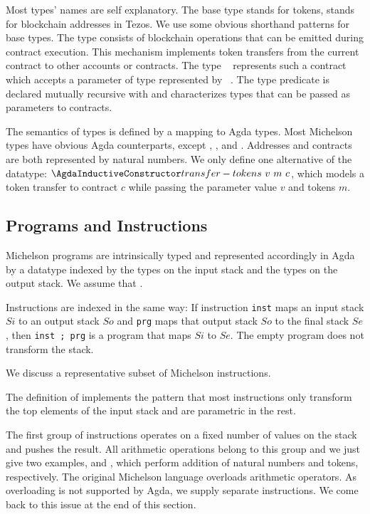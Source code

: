 Most types' names are self explanatory. The base type {\Amutez} stands
for tokens, {\Aaddr} stands for blockchain addresses in  Tezos. We use
some obvious shorthand patterns for base types.
The type {\Aoperation} consists of blockchain operations that can
be emitted during contract execution. This mechanism implements token
transfers from the current contract to other accounts or contracts.
The type {\Acontract~\AP} represents such a contract
which accepts a parameter of type {\Aty} represented by {\APassable~\Aty}.
The type predicate {\TypesPassable} is declared mutually recursive with {\AType}
and characterizes types that can be passed as parameters to contracts.

The semantics of types is defined by a mapping to Agda types. Most
Michelson types have  obvious Agda counterparts, except {\Aaddr},
{\Acontract}, and {\Aoperation}.  Addresses and contracts are both
represented by natural numbers. We only define one alternative of the
{\AOperation} datatype: {$\AtransferTokens~v~m~c$}, which models a
token transfer to contract $c$ while passing the parameter value $v$
and tokens $m$.

\subsection{Programs and Instructions}
\label{sec:michelson-programs}


Michelson programs are intrinsically typed and represented accordingly in
Agda by a datatype {\AProgram} indexed by the types on the input stack
and the types on the output stack. We assume that \TypesStack.
\SyntaxProgram

Instructions are indexed in the same way:
If  instruction \verb/inst/ maps an input stack $Si$ to an output stack $So$
and \verb/prg/ maps that output stack $So$ to the final stack $Se$,
then \verb/inst ; prg/ is a program that maps $Si$ to $Se$.
The empty program {\Aend} does not transform the stack.

We discuss a representative subset of Michelson instructions.
\SyntaxInstruction

The definition of {\AInstructionPlus} implements the pattern that most
instructions only transform the top elements of the input stack and are parametric in the rest. 

The first group of instructions operates on a fixed number of values on
the stack and pushes the result. All arithmetic operations belong to
this group and we just give two examples, {\AADDnn}  and {\AADDm},
which perform addition of natural numbers and tokens, respectively.
The original Michelson language overloads arithmetic operators. As
overloading is not supported by Agda, we supply separate
instructions. We come back to this issue at the end of this section. 

